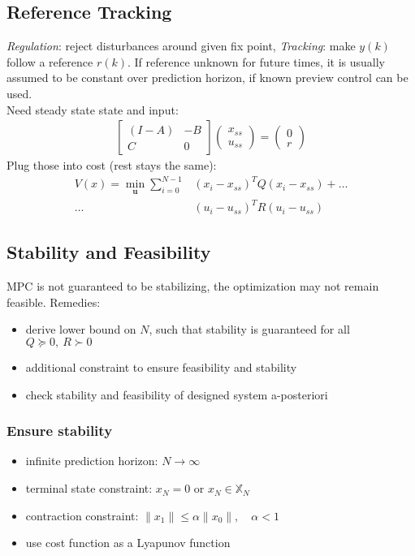 \documentclass[a4paper,landscape,8pt,fleqn]{scrartcl}
\newcommand{\Mn}[1]{\begin{pmatrix}#1\end{pmatrix}} %
\newcommand{\Me}[1]{\begin{bmatrix}#1\end{bmatrix}} %
\newcommand{\mb}[1]{\mathbb{#1}}
\newcommand{\mf}[1]{\mathbf{#1}}
\begin{document}
\begin{multicols}{3}
\subsection{Reference Tracking}
\emph{Regulation}: reject disturbances around given fix point, \emph{Tracking}: make $y(k)$ follow a reference $r(k)$. If reference unknown for future times, it is usually assumed to be constant over prediction horizon, if known preview control can be used.\\
Need steady state state and input:
\begin{align*}
	\Me{(I-A) &-B \\C & 0} \Mn{x_{ss}\\u_{ss}} = \Mn{0 \\ r}
\end{align*}
Plug those into cost (rest stays the same):
\begin{align*}
	V(x) = \min_{\mf{u}} \sum_{i=0}^{N-1}&(x_i - x_{ss})^T Q (x_i - x_{ss}) + \dots\\ \dots&(u_i - u_{ss})^T R (u_i - u_{ss})
\end{align*}
\subsection{Stability and Feasibility}
MPC is not guaranteed to be stabilizing, the optimization may not remain feasible. Remedies:
\begin{itemize}
	\item derive lower bound on $N$, such that stability is guaranteed for all $Q\succeq0,~R \succ 0$
	\item additional constraint to ensure feasibility and stability
	\item check stability and feasibility of designed system a-posteriori
\end{itemize}
\subsubsection{Ensure stability}
\begin{itemize}
	\item infinite prediction horizon: $N \rightarrow \infty$
	\item terminal state constraint: $x_N = 0$ or $ x_N \in \mb{X}_N$
	\item contraction constraint: $\| x_1 \| \leq \alpha \|x_0 \|, \quad \alpha < 1$
	\item use cost function as a Lyapunov function
\end{itemize}

\end{multicols}
\end{document}
